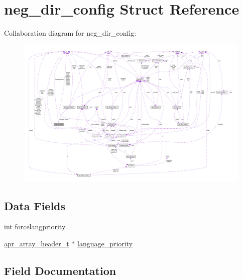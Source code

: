 \hypertarget{structneg__dir__config}{}\section{neg\+\_\+dir\+\_\+config Struct Reference}
\label{structneg__dir__config}


Collaboration diagram for neg\+\_\+dir\+\_\+config\+:
\nopagebreak
\begin{figure}[H]
\begin{center}
\leavevmode
\includegraphics[width=350pt]{structneg__dir__config__coll__graph}
\end{center}
\end{figure}
\subsection*{Data Fields}
\begin{DoxyCompactItemize}
\item 
\hyperlink{pcre_8txt_a42dfa4ff673c82d8efe7144098fbc198}{int} \hyperlink{structneg__dir__config_a8b500a4aeaeb7886aa34e021077c29dd}{forcelangpriority}
\item 
\hyperlink{structapr__array__header__t}{apr\+\_\+array\+\_\+header\+\_\+t} $\ast$ \hyperlink{structneg__dir__config_a67c05d61ade2f50144f8fef467a30037}{language\+\_\+priority}
\end{DoxyCompactItemize}


\subsection{Field Documentation}
